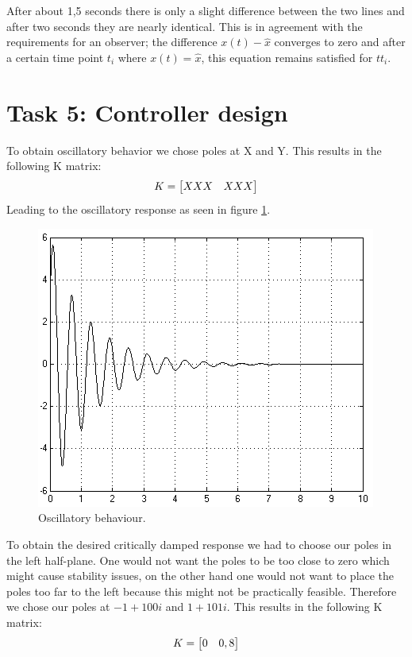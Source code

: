 \documentclass[final]{scrreprt} %
\begin{document}
After about 1,5 seconds there is only a slight difference between the two lines and after two seconds they are nearly identical. This is in agreement with the requirements for an observer; the difference $x(t)-\hat{x}$ converges to zero and after a certain time point $t_i$ where $x(t) = \hat{x}$, this equation remains satisfied for $t$\geq $t_i$.

\section*{Task 5: Controller design}

To obtain oscillatory behavior we chose poles at X and Y. This results in the following K matrix:
\begin{equation}
\centering
K = 
\begin{bmatrix}
  XXX & XXX
\end{bmatrix}
\end{equation}
Leading to the oscillatory response as seen in figure \ref{fig:oscillatory}.

\begin{figure}[h!]
\centering
\includegraphics[scale = 0.5]{res/osc2-res.png}
\caption{Oscillatory behaviour.}
\label{fig:oscillatory}
\end{figure}

To obtain the desired critically damped response we had to choose our poles in the left half-plane. One would not want the poles to be too close to zero which might cause stability issues, on the other hand one would not want to place the poles too far to the left because this might not be practically feasible. Therefore we chose our poles at $-1+100i$ and $1+101i$. This results in the following K matrix:
\begin{equation}
\centering
K =
\begin{bmatrix}
  0 & 0,8
\end{bmatrix}
\end{equation}
\end{document}
